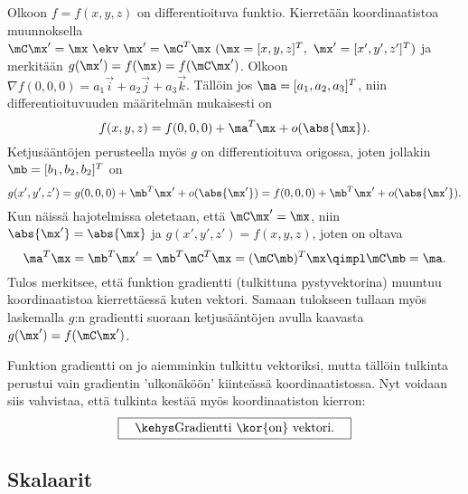 \begin{Exa} Olkoon $f=f(x,y,z)$ on differentioituva funktio. Kierretään koordinaatistoa 
muunnoksella $\mC\mx'=\mx\ \ekv\ \mx'=\mC^T\mx\ (\mx=[x,y,z]^T,\ \mx'=[x',y',z']^T)$ ja 
merkitään $g(\mx')=f(\mx)=f(\mC\mx')$. Olkoon $\nabla f(0,0,0)= a_1\vec i+a_2\vec j+a_3\vec k$.
Tällöin jos $\ma=[a_1,a_2,a_3]^T$, niin differentioituvuuden määritelmän mukaisesti on
\[
f(x,y,z)=f(0,0,0)+\ma^T\mx + o(\abs{\mx}).
\]
Ketjusääntöjen perusteella myös $g$ on differentioituva origossa, joten jollakin 
$\mb=[b_1,b_2,b_2]^T$ on
\[
g(x',y',z')=g(0,0,0)+\mb^T\mx' + o(\abs{\mx'})=f(0,0,0)+\mb^T\mx' + o(\abs{\mx'}).
\]
Kun näissä hajotelmissa oletetaan, että $\mC\mx'=\mx$, niin $\abs{\mx'}=\abs{\mx}$ ja 
$g(x',y',z')=f(x,y,z)$, joten on oltava
\[
\ma^T\mx=\mb^T\mx'=\mb^T\mC^T\mx=(\mC\mb)^T\mx \qimpl \mC\mb=\ma.
\]
Tulos merkitsee, että funktion gradientti (tulkittuna pystyvektorina) muuntuu koordinaatistoa
kierrettäessä kuten vektori. Samaan tulokseen tullaan myös laskemalla $g$:n gradientti suoraan
ketjusääntöjen avulla kaavasta $g(\mx')=f(\mC\mx')$. \loppu
\end{Exa}
Funktion gradientti on jo aiemminkin tulkittu vektoriksi, mutta tällöin tulkinta perustui vain
gradientin 'ulkonäköön' kiinteässä koordinaatistossa. Nyt voidaan siis vahvistaa, että tulkinta
kestää myös koordinaatiston kierron:
\[
\boxed{\quad\kehys \text{Gradientti \kor{on} vektori}. \quad}
\]

\subsection*{Skalaarit}

